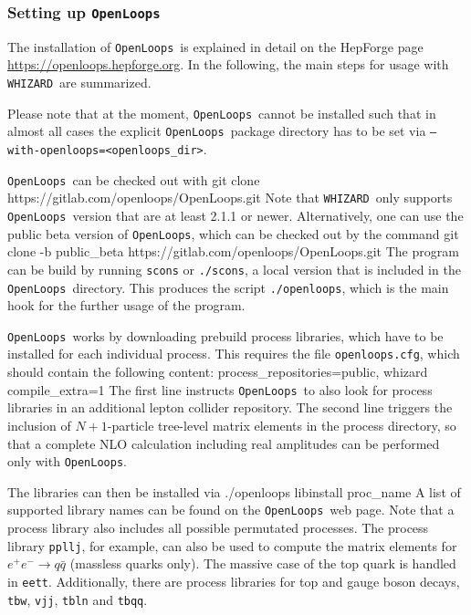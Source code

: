\documentclass[12pt]{book}
\newenvironment{code}%
  {\begingroup\footnotesize
   \quote
   \Verbatim}%
  {\endVerbatim
   \endquote
   \endgroup\noindent}
\newcommand{\ttt}[1]{\texttt{#1}}
\newcommand{\whizard}{\ttt{WHIZARD}}
\newcommand{\openloops}{\ttt{OpenLoops}}
\begin{document}

\subsubsection{Setting up \openloops}
\label{sec:openloops-setup}

The installation of \openloops\ is explained in detail on the HepForge
page \url{https://openloops.hepforge.org}.  In the following, the main
steps for usage with \whizard\ are summarized.

Please note that at the moment, \openloops\ cannot be installed such
that in almost all cases the explicit \openloops\ package directory
has to be set via \ttt{--with-openloops=<openloops\_dir>}.

\openloops\ can be checked out with
\begin{code}
  git clone https://gitlab.com/openloops/OpenLoops.git
\end{code}
Note that \whizard\ only supports \openloops\ version that are at
least 2.1.1 or newer. Alternatively, one can use the public beta
version of \openloops, which can be checked out by the command
\begin{code}
  git clone -b public_beta https://gitlab.com/openloops/OpenLoops.git
\end{code}
The program can be build by running \ttt{scons} or \ttt{./scons}, a
local version that is included in the \openloops\ directory.  This
produces the script \ttt{./openloops}, which is the main hook for the
further usage of the program.

\openloops\ works by downloading prebuild process libraries, which have
to be installed for each individual process. This requires the file
\ttt{openloops.cfg}, which should contain
the following content:
\begin{code}
   [OpenLoops]
   process_repositories=public, whizard
   compile_extra=1
\end{code}
The first line instructs \openloops\ to also look for process libraries
in an additional lepton collider repository.  The second line triggers
the inclusion of $N+1$-particle tree-level matrix elements in the
process directory, so that a complete NLO calculation including real
amplitudes can be performed only with \openloops.

The libraries can then be installed via
\begin{code}
   ./openloops libinstall proc_name
\end{code}
A list of supported library names can be found on the \openloops\ web
page.  Note that a process library also includes all possible permutated
processes.  The process library \ttt{ppllj}, for example, can also be
used to compute the matrix elements for $e^+ e^- \rightarrow q \bar{q}$
(massless quarks only).  The massive case of the top quark is handled in
\ttt{eett}.  Additionally, there are process libraries for top and gauge
boson decays, \ttt{tbw}, \ttt{vjj}, \ttt{tbln} and \ttt{tbqq}.
\end{document}
